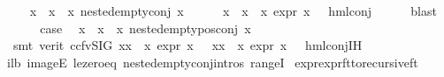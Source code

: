 \begin{isabellebody}
\ \ \isamarkupfalse%
\ {\isachardoublequoteopen}{\isasymforall}x\ {\isasymin}\ x{}\ {\isacharbackquote}{\kern0pt}\ x{}{\isachardot}{\kern0pt}\ nested{\isacharunderscore}{\kern0pt}empty{\isacharunderscore}{\kern0pt}conj\ x{\isachardoublequoteclose}\isanewline
\ \ \ \ \isamarkupfalse%
\ {\isacartoucheopen}{\isasymforall}x\ {\isasymin}\ x{}\ {\isacharbackquote}{\kern0pt}\ x{}{\isachardot}{\kern0pt}\ expr{\isacharunderscore}{\kern0pt}{}\ x\ {\isasymle}\ {}{\isacartoucheclose}\ hml{\isacharunderscore}{\kern0pt}conj\isanewline
\ \ \ \ \isamarkupfalse%
\ blast\isanewline
\ \ \isamarkupfalse%
\ \isamarkupfalse%
\ {\isacharquery}{\kern0pt}case\ \isamarkupfalse%
\ {\isacartoucheopen}{\isasymforall}x\ {\isasymin}\ x{}\ {\isacharbackquote}{\kern0pt}\ x{}{\isachardot}{\kern0pt}\ nested{\isacharunderscore}{\kern0pt}empty{\isacharunderscore}{\kern0pt}pos{\isacharunderscore}{\kern0pt}conj\ x{\isacartoucheclose}\ \isanewline
\ \ \ \ \isamarkupfalse%
\ {\isacharparenleft}{\kern0pt}smt\ {\isacharparenleft}{\kern0pt}verit{\isacharcomma}{\kern0pt}\ ccfv{\isacharunderscore}{\kern0pt}SIG{\isacharparenright}{\kern0pt}\ {\isacartoucheopen}{\isasymforall}x{\isasymin}x{}\ {\isacharbackquote}{\kern0pt}\ x{}{\isachardot}{\kern0pt}\ expr{\isacharunderscore}{\kern0pt}{}\ x\ {\isasymle}\ {}{\isacartoucheclose}\ {\isacartoucheopen}{\isasymforall}x{\isasymin}x{}\ {\isacharbackquote}{\kern0pt}\ x{}{\isachardot}{\kern0pt}\ expr{\isacharunderscore}{\kern0pt}{}\ x\ {\isasymle}\ {}{\isacartoucheclose}\ hml{\isacharunderscore}{\kern0pt}conj{\isachardot}{\kern0pt}IH{\isacharparenleft}{\kern0pt}{}{\isacharparenright}{\kern0pt}\ \isanewline
i{}{\isacharunderscore}{\kern0pt}lb\ imageE\ le{\isacharunderscore}{\kern0pt}zero{\isacharunderscore}{\kern0pt}eq\ nested{\isacharunderscore}{\kern0pt}empty{\isacharunderscore}{\kern0pt}conj{\isachardot}{\kern0pt}intros{\isacharparenleft}{\kern0pt}{}{\isacharparenright}{\kern0pt}\ rangeI{\isacharparenright}{\kern0pt}\isanewline
{}\isamarkupfalse%
%
\endisatagproof
{\isafoldproof}%
%
\isadelimproof
\isanewline
%
\endisadelimproof
\isanewline
{}\isamarkupfalse%
\ expr{\isacharunderscore}{\kern0pt}{}{\isacharunderscore}{\kern0pt}expr{\isacharunderscore}{\kern0pt}{}{\isacharunderscore}{\kern0pt}ft{\isacharunderscore}{\kern0pt}to{\isacharunderscore}{\kern0pt}recursive{\isacharunderscore}{\kern0pt}ft{\isacharcolon}{\kern0pt}\ \isanewline

\end{isabellebody}
